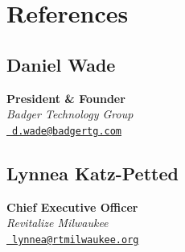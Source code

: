 \documentclass[10pt]{article}
\begin{document}
\section*{References}
\begin{multicols}{2}
  \raggedcolumns

  \subsection*{Daniel Wade}
  \textbf{President \& Founder} \\
  \textit{Badger Technology Group} \\
  \href{mailto:d.wade@badgertg.com}{\faEnvelope\ \texttt{d.wade@badgertg.com}}

  \subsection*{Lynnea Katz-Petted}
  \textbf{Chief Executive Officer} \\
  \textit{Revitalize Milwaukee} \\
  \href{mailto:lynnea@rtmilwaukee.org}{\faEnvelope\ \texttt{lynnea@rtmilwaukee.org}}
\end{multicols}
\end{document}
